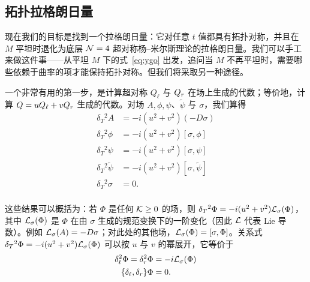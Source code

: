 
\subsection{拓扑拉格朗日量}

\label{sec:toplag}

现在我们的目标是找到一个拉格朗日量：它对任意 $t$ 值都具有拓扑对称，并且在 $M$ 平坦时退化为底层 ${{\mathcal{N}}}=4$ 超对称杨--米尔斯理论的拉格朗日量。我们可以手工来做这件事——从平坦 $M$ 下的式~\eqref{eq:ygo} 出发，追问当 $M$ 不再平坦时，需要哪些依赖于曲率的项才能保持拓扑对称。但我们将采取另一种途径。

一个非常有用的第一步，是计算超对称 $Q_\ell$ 与 $Q_r$ 在场上生成的代数；等价地，计算 $Q=uQ_\ell+vQ_r$ 生成的代数。对场 $A,\phi,\psi$、$\tilde\psi$ 与 $\sigma$，我们算得
\setcounter{equation}{34}
\begin{equation}\label{eq:ibo}
\begin{aligned}\delta_T{}^2 A & = -i(u^2+v^2)(-D\sigma)\\
\delta_T{}^2\phi & = -i(u^2+v^2)[\sigma,\phi]\\ \delta_T{}^2 \psi
& = -i(u^2+v^2)[\sigma,\psi]\\ \delta_T{}^2\tilde\psi& =
-i(u^2+v^2)[\sigma,\tilde\psi]\\ \delta_T{}^2\sigma& = 0.\\\end{aligned}
\end{equation}

这些结果可以概括为：若 $\Phi$ 是任何 ${\mathcal{K}}\geq 0$ 的场，则 $\delta_T{}^2\Phi=-i(u^2+v^2){{{\mathcal{L}}}}_\sigma(\Phi)$，其中 ${{{\mathcal{L}}}}_\sigma(\Phi)$ 是 $\Phi$ 在由 $\sigma$ 生成的规范变换下的一阶变化（因此 ${\mathcal{L}}$ 代表 Lie 导数）。例如 ${{{\mathcal{L}}}}_\sigma(A)=-D\sigma$；对此处的其他场，${{{\mathcal{L}}}}_\sigma(\Phi)=[\sigma,\Phi]$。关系式 $\delta_T{}^2\Phi=-i(u^2+v^2){{{\mathcal{L}}}}_\sigma(\Phi)$ 可以按 $u$ 与 $v$ 的幂展开，它等价于
\setcounter{equation}{35}
\begin{equation}\label{eq:uvu}
\begin{aligned}\delta_\ell^2\Phi=\delta_r^2\Phi&=-i{{{\mathcal{L}}}}_\sigma(\Phi)\\
\{\delta_\ell,\delta_r\}\Phi& = 0.\\\end{aligned}
\end{equation}

